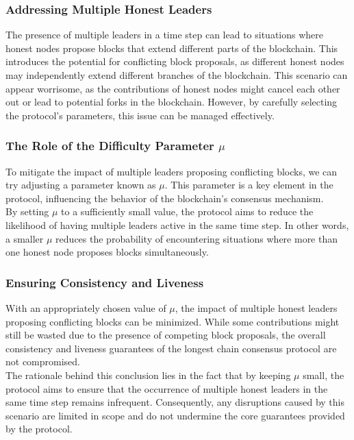 \subsubsection{Addressing Multiple Honest Leaders}
The presence of multiple leaders in a time step can lead to situations where honest nodes propose blocks that extend different parts of the blockchain. This introduces the potential for conflicting block proposals, as different honest nodes may independently extend different branches of the blockchain. This scenario can appear worrisome, as the contributions of honest nodes might cancel each other out or lead to potential forks in the blockchain. However, by carefully selecting the protocol's parameters, this issue can be managed effectively.

\subsubsection{The Role of the Difficulty Parameter $\mu$}
To mitigate the impact of multiple leaders proposing conflicting blocks, we can try adjusting a parameter known as $\mu$. This parameter is a key element in the protocol, influencing the behavior of the blockchain's consensus mechanism.\\
By setting $\mu$ to a sufficiently small value, the protocol aims to reduce the likelihood of having multiple leaders active in the same time step. In other words, a smaller $\mu$ reduces the probability of encountering situations where more than one honest node proposes blocks simultaneously.

\subsubsection{Ensuring Consistency and Liveness}
With an appropriately chosen value of $\mu$, the impact of multiple honest leaders proposing conflicting blocks can be minimized. While some contributions might still be wasted due to the presence of competing block proposals, the overall consistency and liveness guarantees of the longest chain consensus protocol are not compromised.\\
The rationale behind this conclusion lies in the fact that by keeping $\mu$ small, the protocol aims to ensure that the occurrence of multiple honest leaders in the same time step remains infrequent. Consequently, any disruptions caused by this scenario are limited in scope and do not undermine the core guarantees provided by the protocol.

